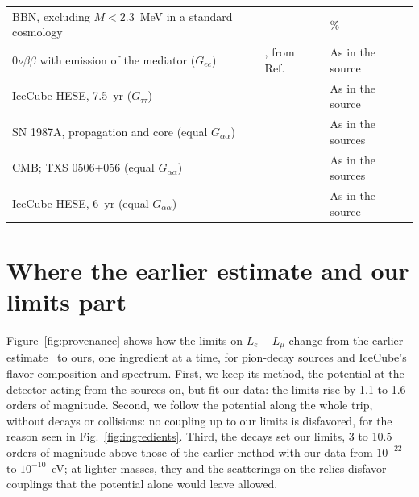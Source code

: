 \documentclass[linenumbers, aps, prd, twocolumn, superscriptaddress, floatfix, longbibliography, nofootinbib, bibnotes]{revtex4-2}
\begin{document}
\begin{table}[t]
\begin{ruledtabular}
\begin{tabular}{>{\raggedright\arraybackslash}p{}>{\raggedright\arraybackslash}p{}>{\raggedright\arraybackslash}p{}}
 BBN, excluding $M < 2.3$~MeV in a standard cosmology & \cite{Blinov:2019gcj} & 95\% \\
 $0\nu\beta\beta$ with emission of the mediator ($G_{ee}$) & \cite{Berryman:2022hds}, from Ref.~\cite{Brune:2018sab} & As in the source \\
 IceCube HESE, 7.5~yr ($G_{\tau\tau}$) & \cite{Esteban:2021tub} & As in the source \\
 SN 1987A, propagation and core (equal $G_{\alpha\alpha}$) & \cite{Shalgar:2019rqe, Kolb:1987qy} & As in the sources \\
 CMB; TXS 0506+056 (equal $G_{\alpha\alpha}$) & \cite{Archidiacono:2013dua, Kelly:2018tyg} & As in the sources \\
 IceCube HESE, 6~yr (equal $G_{\alpha\alpha}$) & \cite{Bustamante:2020mep} & As in the source \\
 \end{tabular}
 \end{ruledtabular}
\end{table}

\section{Where the earlier estimate and our limits part}
\label{app:provenance}
Figure~\ref{fig:provenance} shows how the limits on $L_e - L_\mu$ change from the earlier estimate~\cite{Agarwalla:2023sng} to ours, one ingredient at a time, for pion-decay sources and IceCube's flavor composition and spectrum.
First, we keep its method, the potential at the detector acting from the sources on, but fit our data: the limits rise by 1.1 to 1.6 orders of magnitude.
Second, we follow the potential along the whole trip, without decays or collisions: no coupling up to our limits is disfavored, for the reason seen in Fig.~\ref{fig:ingredients}.
Third, the decays set our limits, 3 to 10.5 orders of magnitude above those of the earlier method with our data from $10^{-22}$ to $10^{-10}$~eV; at lighter masses, they and the scatterings on the relics disfavor couplings that the potential alone would leave allowed.
\end{document}
